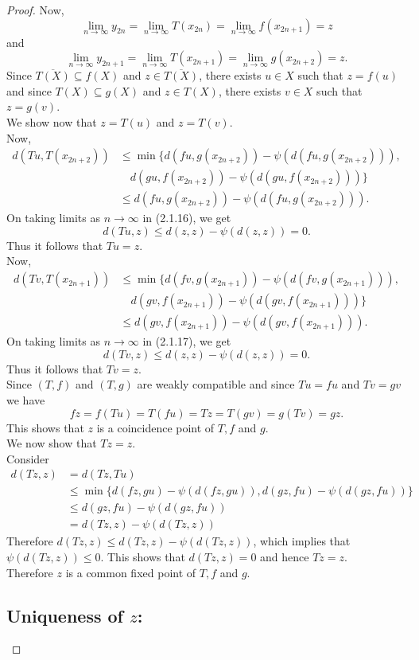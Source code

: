 \documentclass[10pt,a4paper]{amsart}
\begin{document}
\begin{proof}
Now,
\[
\lim_{n\to\infty}y_{2n}=\lim_{n\to\infty}T(x_{2n})=\lim_{n\to\infty}f(x_{2n+1})=z
\]
and
\[
\lim_{n\to\infty}y_{2n+1}=\lim_{n\to\infty}T(x_{2n+1})=\lim_{n\to\infty}g(x_{2n+2})=z.
\]
Since $\overline{T(X)}\subseteq f(X)$ and $z\in\overline{T(X)}$, there exists $u\in X$ such that $z=f(u)$ and since $T(X)\subseteq g(X)$ and $z\in T(X)$, there exists $v\in X$ such that $z=g(v)$.\\
We show now that $z=T(u)$ and $z=T(v)$.\\
Now,
\begin{align}
d(Tu,T(x_{2n+2})) &\leq \min\{d(fu,g(x_{2n+2}))-\psi(d(fu,g(x_{2n+2}))), \nonumber \\
&\quad d(gu,f(x_{2n+2}))-\psi(d(gu,f(x_{2n+2})))\} \nonumber \\
&\leq d(fu,g(x_{2n+2}))-\psi(d(fu,g(x_{2n+2}))).
\end{align}
On taking limits as $n\to\infty$ in (2.1.16), we get
\[
d(Tu,z) \leq d(z,z)-\psi(d(z,z)) = 0.
\]
Thus it follows that $Tu=z$.\\
Now,
\begin{align}
d(Tv,T(x_{2n+1})) &\leq \min\{d(fv,g(x_{2n+1}))-\psi(d(fv,g(x_{2n+1}))), \nonumber \\
&\quad d(gv,f(x_{2n+1}))-\psi(d(gv,f(x_{2n+1})))\} \nonumber \\
&\leq d(gv,f(x_{2n+1}))-\psi(d(gv,f(x_{2n+1}))).
\end{align}
On taking limits as $n\to\infty$ in (2.1.17), we get
\[
d(Tv,z) \leq d(z,z)-\psi(d(z,z)) = 0.
\]
Thus it follows that $Tv=z$.\\
Since $(T,f)$ and $(T,g)$ are weakly compatible and since $Tu=fu$ and $Tv=gv$ we have
\[
fz=f(Tu)=T(fu)=Tz=T(gv)=g(Tv)=gz.
\]
This shows that $z$ is a coincidence point of $T,f$ and $g$.\\
We now show that $Tz=z$.\\
Consider
\begin{align*}
d(Tz,z) &= d(Tz,Tu) \\
&\leq \min\{d(fz,gu)-\psi(d(fz,gu)),d(gz,fu)-\psi(d(gz,fu))\} \\
&\leq d(gz,fu)-\psi(d(gz,fu)) \\
&= d(Tz,z)-\psi(d(Tz,z))
\end{align*}
Therefore $d(Tz,z)\leq d(Tz,z)-\psi(d(Tz,z))$, which implies that $\psi(d(Tz,z))\leq 0$. This shows that $d(Tz,z)=0$ and hence $Tz=z$.\\
Therefore $z$ is a common fixed point of $T,f$ and $g$.

\subsection*{Uniqueness of $z$:}


\end{proof}
\end{document}
